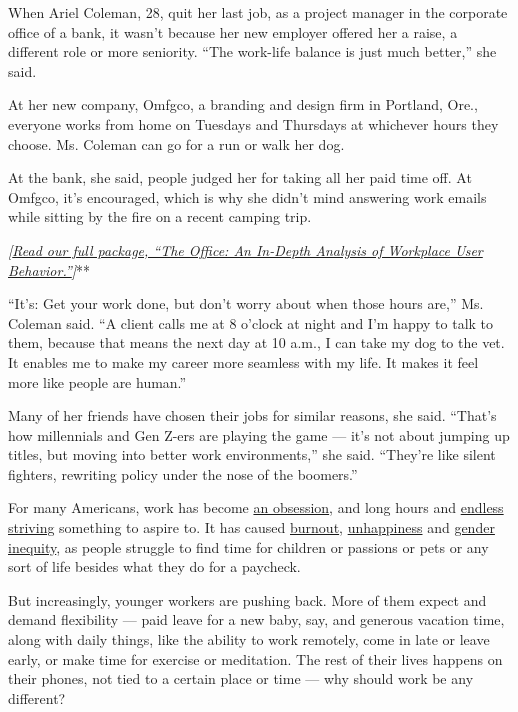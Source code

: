 When Ariel Coleman, 28, quit her last job, as a project manager in the
corporate office of a bank, it wasn't because her new employer offered
her a raise, a different role or more seniority. ``The work-life balance
is just much better,'' she said.

At her new company, Omfgco, a branding and design firm in Portland,
Ore., everyone works from home on Tuesdays and Thursdays at whichever
hours they choose. Ms. Coleman can go for a run or walk her dog.

At the bank, she said, people judged her for taking all her paid time
off. At Omfgco, it's encouraged, which is why she didn't mind answering
work emails while sitting by the fire on a recent camping trip.

\emph{\emph{\emph{{[}}\href{https://www.nytimes3xbfgragh.onion/interactive/2019/09/17/style/the-office.html}{\emph{Read
our full package, ``The Office: An In-Depth Analysis of Workplace User
Behavior.''}}}{]}}**

``It's: Get your work done, but don't worry about when those hours
are,'' Ms. Coleman said. ``A client calls me at 8 o'clock at night and
I'm happy to talk to them, because that means the next day at 10 a.m., I
can take my dog to the vet. It enables me to make my career more
seamless with my life. It makes it feel more like people are human.''

Many of her friends have chosen their jobs for similar reasons, she
said. ``That's how millennials and Gen Z-ers are playing the game ---
it's not about jumping up titles, but moving into better work
environments,'' she said. ``They're like silent fighters, rewriting
policy under the nose of the boomers.''

For many Americans, work has become
\href{https://www.nytimes3xbfgragh.onion/2019/01/26/business/against-hustle-culture-rise-and-grind-tgim.html}{an
obsession}, and long hours and
\href{https://www.theatlantic.com/ideas/archive/2019/02/religion-workism-making-americans-miserable/583441/}{endless
striving} something to aspire to. It has caused
\href{https://www.buzzfeednews.com/article/annehelenpetersen/millennials-burnout-generation-debt-work}{burnout},
\href{https://worldhappiness.report/ed/2019/}{unhappiness} and
\href{https://www.nytimes3xbfgragh.onion/2019/04/26/upshot/women-long-hours-greedy-professions.html}{gender
inequity}, as people struggle to find time for children or passions or
pets or any sort of life besides what they do for a paycheck.

But increasingly, younger workers are pushing back. More of them expect
and demand flexibility --- paid leave for a new baby, say, and generous
vacation time, along with daily things, like the ability to work
remotely, come in late or leave early, or make time for exercise or
meditation. The rest of their lives happens on their phones, not tied to
a certain place or time --- why should work be any different?

